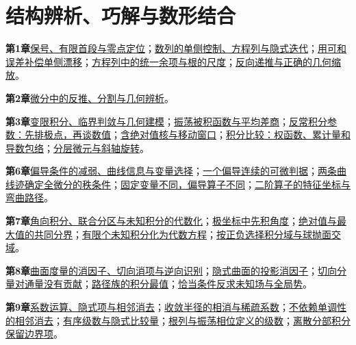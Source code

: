 \section{结构辨析、巧解与数形结合}
\par\noindent\textbf{第1章}\quad \hyperref[cd:limits-sign]{保号、有限首段与零点定位}；\hyperref[cs:section]{数列的单侧控制、方程列与隐式迭代}；\hyperref[cs:drift]{用可和误差补偿单侧漂移}；\hyperref[cs:roots]{方程列中的统一余项与根的尺度}；\hyperref[cs:inverse]{反向递推与正确的几何缩放}。\par
\par\noindent\textbf{第2章}\quad \hyperref[cd:differential]{微分中的反推、分割与几何辨析}。\par
\par\noindent\textbf{第3章}\quad \hyperref[ci:integrals]{变限积分、临界判敛与几何建模}；\hyperref[ci:oscillatory]{振荡被积函数与平均差商}；\hyperref[ci:parameterdomain]{反常积分参数：先排极点，再谈数值}；\hyperref[ci:kernelwindow]{含绝对值核与移动窗口}；\hyperref[ci:inequality]{积分比较：权函数、累计量和导数包络}；\hyperref[ci:geometry]{分层微元与斜轴旋转}。\par
\par\noindent\textbf{第6章}\quad \hyperref[cmv:section]{偏导条件的减弱、曲线信息与变量选择}；\hyperref[cmv:onepartial]{一个偏导连续的可微判据}；\hyperref[cmv:traces]{两条曲线迹确定全微分的秩条件}；\hyperref[cmv:coordinates]{固定变量不同，偏导算子不同}；\hyperref[cmv:operators]{二阶算子的特征坐标与弯曲路径}。\par
\par\noindent\textbf{第7章}\quad \hyperref[cmi:section]{角向积分、联合分区与未知积分的代数化}；\hyperref[cmi:angular]{极坐标中先积角度}；\hyperref[cmi:partition]{绝对值与最大值的共同分界}；\hyperref[cmi:finiterank]{有限个未知积分化为代数方程}；\hyperref[cmi:regions]{按正负选择积分域与球抛面交域}。\par
\par\noindent\textbf{第8章}\quad \hyperref[cf:section]{曲面度量的消因子、切向消项与逆向识别}；\hyperref[cf:projection]{隐式曲面的投影消因子}；\hyperref[cf:tangent]{切向分量对通量没有贡献}；\hyperref[cf:pathfamily]{路径族的积分最值}；\hyperref[cf:inverse]{恰当条件反求未知场与全局势}。\par
\par\noindent\textbf{第9章}\quad \hyperref[cse:section]{系数运算、隐式项与相邻消去}；\hyperref[cse:radius]{收敛半径的相消与稀疏系数}；\hyperref[cse:pair]{不依赖单调性的相邻消去}；\hyperref[cse:implicit]{有序级数与隐式比较量}；\hyperref[cse:rootphase]{根列与振荡相位定义的级数}；\hyperref[cse:weighted]{离散分部积分保留边界项}。\par
